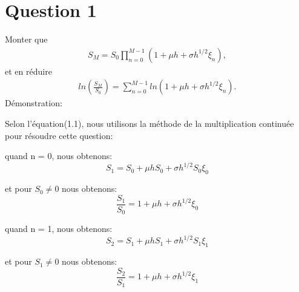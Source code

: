 \documentclass[a4paper,10pt]{report}
\begin{document}
\section{Question 1}
\noindent Monter que 
\begin{align*}
	S_{M} = S_{0} \prod_{n=0}^{M-1} (1 + \mu h + \sigma h^{1/2} \xi_{n}),
\end{align*}
\noindent et en réduire
\begin{align*}
	ln(\frac{S_{M}}{S_{0}}) = \sum_{n=0}^{M-1} ln(1  + \mu h + \sigma h^{1/2} \xi_{n}).
\end{align*}
\noindent Démonstration:
\par Selon l'équation(1.1), nous utilisons la méthode de la multiplication continuée pour résoudre cette question:
\par quand n = 0, nous obtenons:
\begin{equation}
	S_{1} = S_{0} + \mu h S_{0} + \sigma h^{1/2} S_{0} \xi_{0}
\end{equation} 
\par et pour $S_{0} \neq 0$ nous obtenons:
\begin{equation}
\frac{S_{1}}{S_{0}} = 1 + \mu h + \sigma h^{1/2} \xi_{0}
\end{equation} 
\par quand n = 1, nous obtenons:
\begin{equation}
S_{2} = S_{1} + \mu h S_{1} + \sigma h^{1/2} S_{1} \xi_{1}
\end{equation}
\par et pour $S_{1} \neq 0$ nous obtenons:
\begin{equation}
\frac{S_{2}}{S_{1}} = 1 + \mu h + \sigma h^{1/2} \xi_{1}
\end{equation} 	
\end{document}

